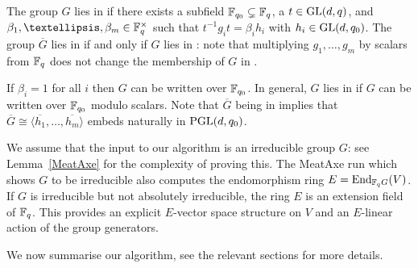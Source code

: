 \begin{Def}
The group $G$ lies in  if there exists a subfield $\mathbb{F}_{q_0} \subsetneq
\mathbb{F}_q$, a $t \in \GL(d,q)$, and $\beta_1, \ldots, \beta_m
\in \F_q^\times$ such that $t^{-1}g_it = \beta_i  h_i$ with
$h_i \in \GL(d,q_0)$. The group $\overline{G}$ lies in  if and only if 
$G$ lies in : note 
that multiplying $g_1, \ldots, g_m$ 
 by scalars from $\mathbb{F}_q$ does not change the membership of $G$ in . 
\end{Def}
If $\beta_i = 1$ for all $i$ then $G$ can be
written over  $\mathbb{F}_{q_0}$. In general, $G$ lies in
 if $G$ can be written over $\mathbb{F}_{q_0}$ modulo
scalars.
Note
that $\overline{G}$ being in  implies that 
$\overline{G} \cong \langle \overline{h_1}, 
\ldots, \overline{h_m} \rangle$ embeds naturally in $\PGL(d,q_0)$.

We assume that the input to our algorithm is an irreducible group
$G$: see Lemma~\ref{MeatAxe} 
for the complexity of proving this. The MeatAxe run which shows $G$ 
to be irreducible also computes the endomorphism ring $E = \End_{\F_q G}(V)$.
  If $G$ is irreducible  but not
absolutely irreducible, the ring $E$ is an
extension field of $\mathbb{F}_q$. This provides an explicit $E$-vector 
space structure on $V$ and an $E$-linear action of the
group generators.

\vspace{3mm}
\noindent We now summarise our algorithm, see the relevant sections for
more details. 


